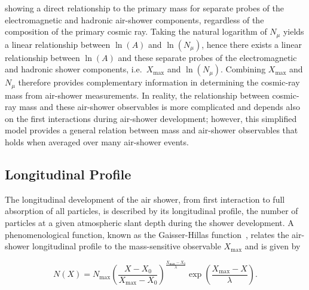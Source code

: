 \noindent
showing a direct relationship to the primary mass for separate probes of the electromagnetic and hadronic air-shower components, regardless of the composition of the primary cosmic ray.
Taking the natural logarithm of $N_{\mu}$ yields a linear relationship between $\ln(A)$ and $\ln(N_{\mu})$, hence there exists a linear relationship between $\ln(A)$ and these separate probes of the electromagnetic and hadronic shower components, i.e.~$X_{\text{max}}$ and $\ln\left(N_{\mu}\right)$.
Combining $X_{\text{max}}$ and $N_{\mu}$ therefore provides complementary information in determining the cosmic-ray mass from air-shower measurements.
In reality, the relationship between cosmic-ray mass and these air-shower observables is more complicated and depends also on the first interactions during air-shower development; however, this simplified model provides a general relation between mass and air-shower observables that holds when averaged over many air-shower events.

\subsection{Longitudinal Profile}\label{ssec:long_profile}
The longitudinal development of the air shower, from first interaction to full absorption of all particles, is described by its longitudinal profile, the number of particles at a given atmospheric slant depth during the shower development.
A phenomenological function, known as the Gaisser-Hillas function~\cite{gaisser_icrc1977_gh}, relates the air-shower longitudinal profile to the mass-sensitive observable $X_\text{max}$ and is given by

\begin{equation}
    N\left( X \right) = N_{\text{max}} \left( \frac{X - X_{0}}{X_{\text{max}} - X_{0}} \right)^{\frac{X_{\text{max}} - X_{0}}{\lambda}} \exp\left( \frac{X_{\text{max}} - X}{\lambda} \right). \label{eq:gh}
\end{equation}

